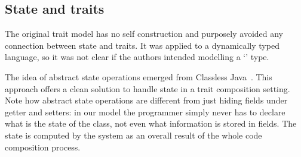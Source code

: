 


\subsection{State and traits}
The original trait model has no self construction 
and purposely avoided any connection between state and traits.
It was applied to a dynamically typed language, so
it was not clear if the authors intended modelling a `\Q@This@' type.

The idea of abstract state operations emerged from Classless
Java~\cite{wang2016classless}. This approach offers a clean solution to handle state
in a trait composition setting.
Note how abstract state operations are different from just hiding fields under getter and setters: 
in our model the programmer simply never has to declare what is the state of the class, not even what information is stored in fields.
The state is computed by the system as an overall result of the whole code composition process.


